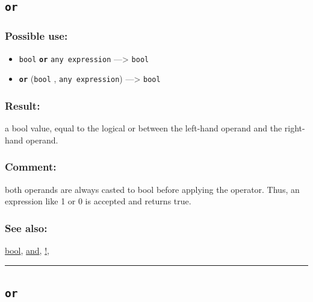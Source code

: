 \documentclass[]{book}
\providecommand{\tightlist}{%
  \setlength{\itemsep}{0pt}\setlength{\parskip}{0pt}}
\theoremstyle{definition}
\theoremstyle{definition}
\theoremstyle{definition}
\theoremstyle{remark}
\begin{document}
\subsection{\texorpdfstring{\texttt{or}}{or}}\label{or}

\subsubsection{Possible use:}\label{possible-use-385}

\begin{itemize}
\tightlist
\item
  \texttt{bool} \textbf{\texttt{or}} \texttt{any\ expression}
  ---\textgreater{} \texttt{bool}
\item
  \textbf{\texttt{or}} (\texttt{bool} , \texttt{any\ expression})
  ---\textgreater{} \texttt{bool}
\end{itemize}

\subsubsection{Result:}\label{result-371}

a bool value, equal to the logical or between the left-hand operand and
the right-hand operand.

\subsubsection{Comment:}\label{comment-75}

both operands are always casted to bool before applying the operator.
Thus, an expression like 1 or 0 is accepted and returns true.

\subsubsection{See also:}\label{see-also-152}

\href{operators-b-to-c.html\#bool}{bool},
\href{operators-a-to-a.html\#and}{and},
\href{operators-a-to-a.html\#!}{!},

\begin{center}\rule{0.5\linewidth}{\linethickness}\end{center}

\subsection{\texorpdfstring{\texttt{or}}{or}}\label{or-1}
\end{document}
